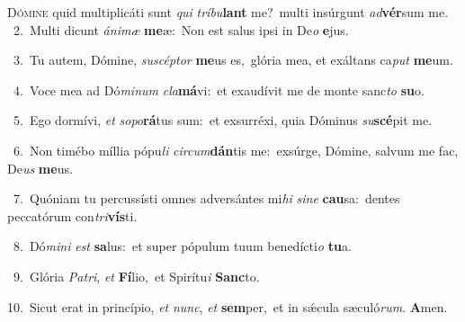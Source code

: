 \lettrine{\initial\textcolor{\initialcolor}{D}}{ómine} quid multiplicáti sunt \textit{qui} \textit{trí}\-\textit{bu}\textbf{lant} me?~\star multi insúrgunt \textit{ad}\-\textbf{vér}sum me.\\
{\numbfont\textcolor{\numbcolor}{~2.}}~Multi dicunt \textit{á}\-\textit{ni}\textit{mæ} \textbf{me}\-æ:~\star Non est salus ipsi in De\textit{o} \textbf{e}\-jus.\par
{\numbfont\textcolor{\numbcolor}{~3.}}~Tu autem, Dómine, \textit{su}\-\textit{scép}\textit{tor} \textbf{me}\-us es,~\star glória mea, et exáltans ca\textit{put} \textbf{me}\-um.\par
{\numbfont\textcolor{\numbcolor}{~4.}}~Voce mea ad Dó\-\textit{mi}\-\textit{num} \textit{cla}\-\textbf{má}vi:~\star et exaudívit me de monte sanc\textit{to} \textbf{su}\-o.\par
{\numbfont\textcolor{\numbcolor}{~5.}}~Ego dormívi, \textit{et} \textit{so}\-\textit{po}\textbf{rá}tus sum:~\star et exsurréxi, quia Dóminus \textit{su}\-\textbf{scé}pit me.\par
{\numbfont\textcolor{\numbcolor}{~6.}}~Non timébo míllia pópu\textit{li} \textit{cir}\-\textit{cum}\textbf{dán}tis me:~\star exsúrge, Dómine, salvum me fac, De\textit{us} \textbf{me}\-us.\par
{\numbfont\textcolor{\numbcolor}{~7.}}~Quóniam tu percussísti omnes adversántes mi\textit{hi} \textit{si}\-\textit{ne} \textbf{cau}\-sa:~\star dentes peccatórum con\-\textit{tri}\-\textbf{vís}ti.\par
{\numbfont\textcolor{\numbcolor}{~8.}}~Dó\-\textit{mi}\-\textit{ni} \textit{est} \textbf{sa}\-lus:~\star et super pópulum tuum benedícti\textit{o} \textbf{tu}\-a.\par
{\numbfont\textcolor{\numbcolor}{~9.}}~Glória \textit{Pa}\-\textit{tri}, \textit{et} \textbf{Fí}\-lio,~\star et Spirítu\textit{i} \textbf{Sanc}\-to.\par
{\numbfont\textcolor{\numbcolor}{10.}}~Sicut erat in princípio, \textit{et} \textit{nunc}\-, \textit{et} \textbf{sem}\-per,~\star et in sǽcula sæculó\-\textit{rum}\-. \textbf{A}\-men.\par
